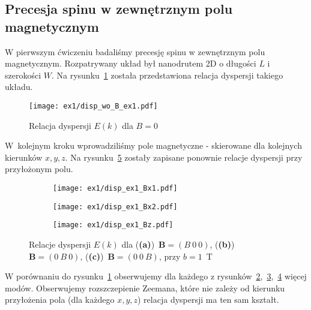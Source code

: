 \documentclass{article}
\begin{document}
\subsection{Precesja spinu w zewnętrznym polu magnetycznym}
W pierwszym ćwiczeniu badaliśmy precesję spinu w zewnętrznym polu magnetycznym.
Rozpatrywany układ był nanodrutem 2D o długości $L$ i szerokości $W$.
Na rysunku~\ref{fig:ex1-rel-dysp-woB} została przedstawiona relacja dyspersji takiego układu.
\begin{figure}[htp!]
    \centering
    \texttt{[image: ex1/disp\_wo\_B\_ex1.pdf]}
    \caption{Relacja dyspersji $E(k)$ dla $B = 0$}
    \label{fig:ex1-rel-dysp-woB}
\end{figure}
W~kolejnym kroku wprowadziliśmy pole magnetyczne - skierowane dla kolejnych kierunków $x, y, z$.
Na rysunku~\ref{fig:ex1-relacja-dyspersji} zostały zapisane ponownie relacje dyspersji przy przyłożonym polu.
\begin{figure}[htp!]
    \centering
\begin{subfigure}{.32\textwidth}
    \centering
    \texttt{[image: ex1/disp\_ex1\_Bx1.pdf]}
    \caption{}
    \label{fig:disp_ex1_Bx1}
\end{subfigure}
\begin{subfigure}{.32\textwidth}
    \centering
    \texttt{[image: ex1/disp\_ex1\_Bx2.pdf]}
    \caption{}
    \label{fig:disp_ex1_Bx2}
\end{subfigure}
\begin{subfigure}{.32\textwidth}
    \centering
    \texttt{[image: ex1/disp\_ex1\_Bz.pdf]}
    \caption{}
    \label{fig:disp_ex1_Bz}
\end{subfigure}
\caption{Relacje dyspersji $E(k)$ dla (\textbf{(a)})~$\mathbf{B} = (B \ 0 \ 0)$, (\textbf{(b)})~$\mathbf{B} = (0 \ B \ 0)$, (\textbf{(c)})~$\mathbf{B} = (0 \ 0 \ B)$, przy $b = 1$~T}
\label{fig:ex1-relacja-dyspersji}
\end{figure}
W porównaniu do rysunku~\ref{fig:ex1-rel-dysp-woB} obserwujemy dla każdego z rysunków~\ref{fig:disp_ex1_Bx1},~\ref{fig:disp_ex1_Bx2},~\ref{fig:disp_ex1_Bz} więcej modów.
Obserwujemy rozszczepienie Zeemana, które nie zależy od kierunku przyłożenia pola (dla każdego $x, y, z$) relacja dyspersji ma ten sam kształt.\\
\\
\end{document}

